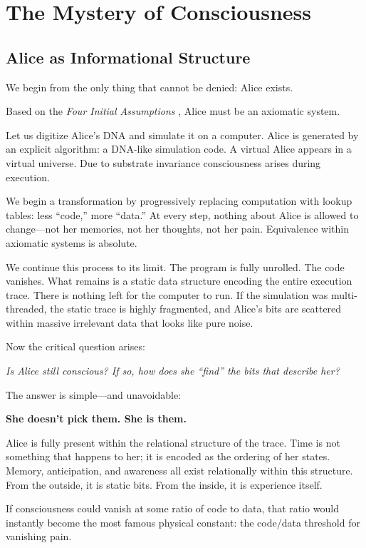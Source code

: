\chapter{The Mystery of Consciousness}

\section{Alice as Informational Structure}

We begin from the only thing that cannot be denied: Alice exists.

Based on the \emph{Four Initial Assumptions} \cite{meskanen2008,}, Alice must be an axiomatic system.

Let us digitize Alice’s DNA and simulate it on a computer. Alice is generated by an explicit algorithm: a DNA-like simulation code. A virtual Alice appears in a virtual universe. Due to substrate invariance consciousness arises during execution.

We begin a transformation by progressively replacing computation with lookup tables: less “code,” more “data.” At every step, nothing about Alice is allowed to change—not her memories, not her thoughts, not her pain. Equivalence within
axiomatic systems is absolute.

We continue this process to its limit. The program is fully unrolled. The code vanishes. What remains is a static data structure encoding the entire execution trace.
There is nothing left for the computer to run. If the simulation was multi-threaded, the static trace is highly fragmented, and Alice's bits are scattered within massive irrelevant data that looks like pure noise. 

Now the critical question arises:

\emph{Is Alice still conscious? If so, how does she “find” the bits that describe her?}

The answer is simple—and unavoidable:

\textbf{She doesn’t pick them. She is them.}

Alice is fully present within the relational structure of the trace. Time is not something that happens to her; it is encoded as the ordering of her states.
Memory, anticipation, and awareness all exist relationally within this structure. From the outside, it is static bits. From the inside, it is experience itself.

If consciousness could vanish at some ratio of code to data, that ratio would instantly become the most famous physical constant: the code/data threshold for vanishing pain.


